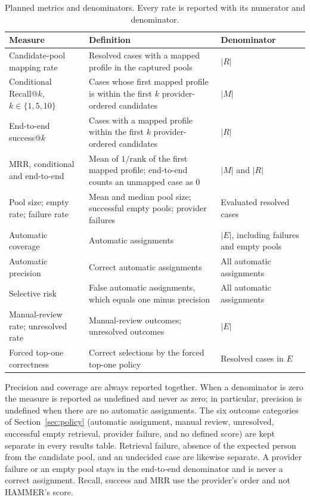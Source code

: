 \begin{table}[t]
\caption{Planned metrics and denominators. Every rate is reported with its numerator and denominator.}
\label{tab:metrics}
\centering
\footnotesize
\renewcommand{\arraystretch}{1.12}
\begin{tabular}{@{}p{}p{}p{}@{}}
\toprule
\textbf{Measure} & \textbf{Definition} & \textbf{Denominator} \\
\midrule
Candidate-pool mapping rate & Resolved cases with a mapped profile in the captured pools & $|R|$ \\
Conditional Recall@$k$, $k\in\{1,5,10\}$ & Cases whose first mapped profile is within the first $k$ provider-ordered candidates & $|M|$ \\
End-to-end success@$k$ & Cases with a mapped profile within the first $k$ provider-ordered candidates & $|R|$ \\
MRR, conditional and end-to-end & Mean of $1/\text{rank}$ of the first mapped profile; end-to-end counts an unmapped case as 0 & $|M|$ and $|R|$ \\
Pool size; empty rate; failure rate & Mean and median pool size; successful empty pools; provider failures & Evaluated resolved cases \\
Automatic coverage & Automatic assignments & $|E|$, including failures and empty pools \\
Automatic precision & Correct automatic assignments & All automatic assignments \\
Selective risk & False automatic assignments, which equals one minus precision & All automatic assignments \\
Manual-review rate; unresolved rate & Manual-review outcomes; unresolved outcomes & $|E|$ \\
Forced top-one correctness & Correct selections by the forced top-one policy & Resolved cases in $E$ \\
\bottomrule
\end{tabular}
\end{table}

Precision and coverage are always reported together. When a denominator is zero the measure is reported as undefined and never as zero; in particular, precision is undefined when there are no automatic assignments. The six outcome categories of Section~\ref{sec:policy} (automatic assignment, manual review, unresolved, successful empty retrieval, provider failure, and no defined score) are kept separate in every results table. Retrieval failure, absence of the expected person from the candidate pool, and an undecided case are likewise separate. A provider failure or an empty pool stays in the end-to-end denominator and is never a correct assignment. Recall, success and MRR use the provider's order and not HAMMER's score.


